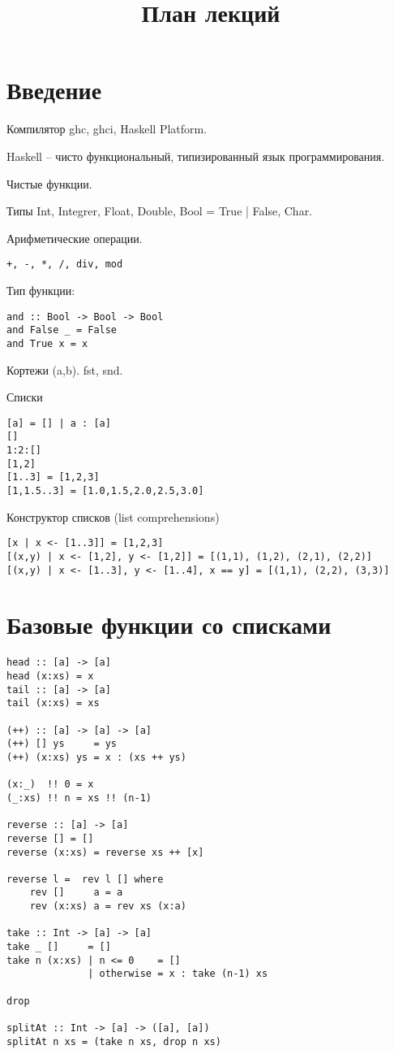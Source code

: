 \documentclass[a4paper,10pt]{article}
\begin{document}
\lstset{language=Haskell} 
\setcounter{secnumdepth}{0}
\title{План лекций}
\date{}
\maketitle

\section{Введение}
Компилятор ghc, ghci, Haskell Platform.

Haskell – чисто функциональный, типизированный язык программирования.

Чистые функции.

Типы Int, Integrer, Float, Double, Bool = True | False, Char.

Арифметические операции.
\begin{lstlisting}
+, -, *, /, div, mod
\end{lstlisting}

Тип функции:
\begin{lstlisting}
and :: Bool -> Bool -> Bool
and False _ = False
and True x = x
\end{lstlisting}

Кортежи (a,b).
fst, snd.

Списки
\begin{lstlisting}
[a] = [] | a : [a]
[]
1:2:[]
[1,2]
[1..3] = [1,2,3]
[1,1.5..3] = [1.0,1.5,2.0,2.5,3.0]
\end{lstlisting}

Конструктор списков (list comprehensions)
\begin{lstlisting}
[x | x <- [1..3]] = [1,2,3]
[(x,y) | x <- [1,2], y <- [1,2]] = [(1,1), (1,2), (2,1), (2,2)]
[(x,y) | x <- [1..3], y <- [1..4], x == y] = [(1,1), (2,2), (3,3)]
\end{lstlisting}

\section{Базовые функции со списками}
\begin{lstlisting}
head :: [a] -> [a]
head (x:xs) = x
tail :: [a] -> [a]
tail (x:xs) = xs

(++) :: [a] -> [a] -> [a]
(++) [] ys     = ys
(++) (x:xs) ys = x : (xs ++ ys)

(x:_)  !! 0 = x
(_:xs) !! n = xs !! (n-1)

reverse :: [a] -> [a]
reverse [] = []
reverse (x:xs) = reverse xs ++ [x]

reverse l =  rev l [] where
    rev []     a = a
    rev (x:xs) a = rev xs (x:a)

take :: Int -> [a] -> [a]
take _ []     = []
take n (x:xs) | n <= 0    = []
              | otherwise = x : take (n-1) xs

drop

splitAt :: Int -> [a] -> ([a], [a])
splitAt n xs = (take n xs, drop n xs)
\end{lstlisting}
\end{document}
